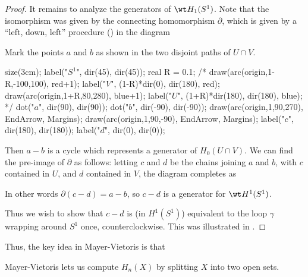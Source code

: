\begin{proof}
	It remains to analyze the generators of $\wt H_1(S^1)$.
	Note that the isomorphism was given by the connecting homomorphism $\partial$,
	which is given by a ``left, down, left'' procedure ()
	in the diagram
	\begin{center}
	\end{center}
	Mark the points $a$ and $b$ as shown in the two disjoint paths of $U \cap V$.
	\begin{center}
		\begin{asy}
			size(3cm);
			label("$S^1$", dir(45), dir(45));
			real R = 0.1;
			/*
			draw(arc(origin,1-R,-100,100), red+1);
			label("$V$", (1-R)*dir(0), dir(180), red);
			draw(arc(origin,1+R,80,280), blue+1);
			label("$U$", (1+R)*dir(180), dir(180), blue);
			*/
			dot("$a$", dir(90), dir(90));
			dot("$b$", dir(-90), dir(-90));
			draw(arc(origin,1,90,270), EndArrow, Margins);
			draw(arc(origin,1,90,-90), EndArrow, Margins);
			label("$c$", dir(180), dir(180));
			label("$d$", dir(0), dir(0));
		\end{asy}
	\end{center}
	Then $a-b$ is a cycle which represents a generator of $H_0(U \cap V)$.
	We can find the pre-image of $\partial$ as follows:
	letting $c$ and $d$ be the chains joining $a$ and $b$, with $c$ contained
	in $U$, and $d$ contained in $V$, the diagram completes as
	\begin{center}
	\end{center}
	In other words $\partial(c-d) = a-b$, so $c-d$ is a generator for $\wt H^1(S^1)$.

	Thus we wish to show that $c-d$ is (in $H^1(S^1)$) equivalent to the loop $\gamma$
	wrapping around $S^1$ once, counterclockwise.
	This was illustrated in .
\end{proof}

Thus, the key idea in Mayer-Vietoris is that
\begin{moral}
	Mayer-Vietoris lets us compute $H_n(X)$
	by splitting $X$ into two open sets.
\end{moral}


